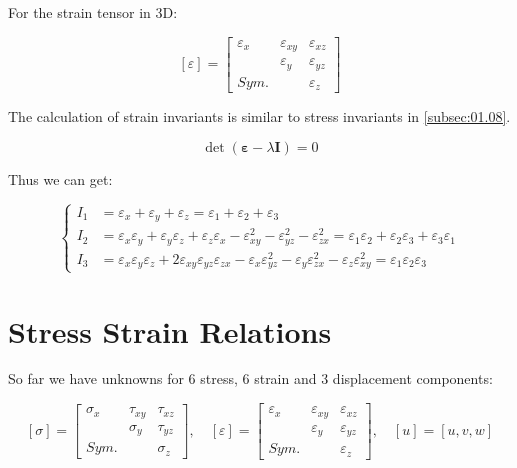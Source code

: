 \documentclass[en,hazy,cyan,8pt,normal]{elegantnote}
\numberwithin{equation}{section}
\begin{document}
  For the strain tensor in 3D:

  \begin{equation}\label{eq:048}
    [\varepsilon]=
    \begin{bmatrix}
      \varepsilon_x & \varepsilon_{xy} & \varepsilon_{xz}\\
        & \varepsilon_y & \varepsilon_{yz}\\
      Sym. &  & \varepsilon_z
    \end{bmatrix}
  \end{equation}

  The calculation of strain invariants is similar to stress invariants in \cref{subsec:01.08}. 
  
  \begin{equation}\label{eq:049}
    \det(\mathbf{\varepsilon}-\lambda \mathbf{I})=0
  \end{equation}

  Thus we can get:

  \begin{equation}\label{eq:050}
    \left\{
      \begin{aligned}
        I_1 &= \varepsilon_x + \varepsilon_y + \varepsilon_z=\varepsilon_1 + \varepsilon_2 + \varepsilon_3\\
        I_2 &= \varepsilon_x \varepsilon_y + \varepsilon_y \varepsilon_z + \varepsilon_z \varepsilon_x - \varepsilon_{xy}^2 - \varepsilon_{yz}^2 - \varepsilon_{zx}^2 = \varepsilon_1 \varepsilon_2 + \varepsilon_2 \varepsilon_3 + \varepsilon_3 \varepsilon_1\\
        I_3 &= \varepsilon_x \varepsilon_y \varepsilon_z + 2 \varepsilon_{xy} \varepsilon_{yz} \varepsilon_{zx} - \varepsilon_x \varepsilon_{yz}^2 - \varepsilon_y \varepsilon_{zx}^2 - \varepsilon_z \varepsilon_{xy}^2 = \varepsilon_1 \varepsilon_2 \varepsilon_3
      \end{aligned}
    \right.
  \end{equation}


\section{Stress Strain Relations}\label{sec:03}

  So far we have unknowns for 6 stress, 6 strain and 3 displacement components:

  \begin{equation}\label{eq:051}
    [\sigma]=
    \begin{bmatrix}
      \sigma_x & \tau_{xy} & \tau_{xz}\\
        & \sigma_y & \tau_{yz}\\
      Sym. &   & \sigma_z
    \end{bmatrix}, \quad
    [\varepsilon]=
    \begin{bmatrix}
      \varepsilon_x & \varepsilon_{xy} & \varepsilon_{xz}\\
        & \varepsilon_y & \varepsilon_{yz}\\
      Sym. &   & \varepsilon_z
    \end{bmatrix}, \quad
    [u]=[u, v, w]
  \end{equation}
\end{document}
